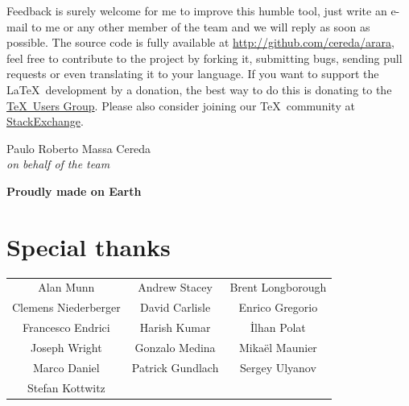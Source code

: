 \documentclass[a4paper,twoside,12pt]{memoir}
\begin{document}
Feedback is surely welcome for me to improve this humble tool, just write an e-mail to me or any other
member of the team and we will reply as soon as possible. The source code is fully available at
\url{http://github.com/cereda/arara}, feel free to contribute to the project by forking it, submitting bugs,
sending pull requests or even translating it to your language. If you want to support the \LaTeX\ development
by a donation, the best way to do this is donating to the \href{http://www.tug.org/}{\TeX\ Users Group}.
Please also  consider joining our \TeX\ community at \href{http://tex.stackexchange.com}{StackExchange}.

\vspace{2em}

\begin{flushright}
Paulo Roberto Massa Cereda\\
\emph{on behalf of the \arara team}
\end{flushright}

\vfill

\begin{center}
\scalebox{0.55}{\araralogo}

\vspace{0.3em}

{\color{araracolor}\bfseries\large Proudly made on Earth}
\end{center}

\cleardoublepage

\section*{Special thanks}

\begin{mdframed}[roundcorner=10pt,linecolor=araracolor,middlelinewidth=1pt]
\centering
{\renewcommand{\arraystretch}{1.5}
\sffamily
\begin{tabular}{ccc}
Alan Munn & Andrew Stacey & Brent Longborough\\
Clemens Niederberger & David Carlisle & Enrico Gregorio\\
Francesco Endrici & Harish Kumar & \.Ilhan Polat\\
Joseph Wright & Gonzalo Medina & Mikaël Maunier\\
Marco Daniel & Patrick Gundlach & Sergey Ulyanov\\
Stefan Kottwitz & &
\end{tabular}}
\end{mdframed}
\end{document}
